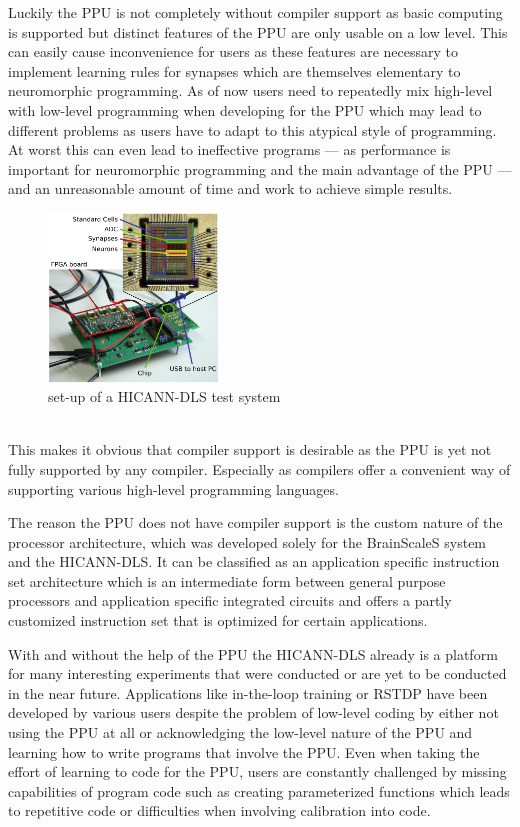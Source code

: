 Luckily the PPU is not completely without compiler support as basic computing is supported but distinct features of the PPU are only usable on a low level.
This can easily cause inconvenience for users as these features are necessary to implement learning rules for synapses which are themselves elementary to neuromorphic programming.
As of now users need to repeatedly mix high-level with low-level programming when developing for the PPU which may lead to different problems as users have to adapt to this atypical style of programming.
At worst this can even lead to ineffective programs --- as performance is important for neuromorphic programming and the main advantage of the PPU --- and an unreasonable amount of time and work to achieve simple results.
\\
\begin{figure}
    \centering
    \includegraphics[width=0.4\textwidth]{pictures/Fig1.png}
    \caption{\label{fig:dlsboard} set-up of a HICANN-DLS test system}
\end{figure}
\\
This makes it obvious that compiler support is desirable as the PPU is yet not fully supported by any compiler.
Especially as compilers offer a convenient way of supporting various high-level programming languages.

The reason the PPU does not have compiler support is the custom nature of the processor architecture, which was developed solely for the BrainScaleS system and the HICANN-DLS.
It can be classified as an application specific instruction set architecture which is an intermediate form between general purpose processors and application specific integrated circuits and offers a partly customized instruction set that is optimized for certain applications.

With and without the help of the PPU the HICANN-DLS already is a platform for many interesting experiments that were conducted or are yet to be conducted in the near future.
Applications like in-the-loop training or RSTDP have been developed by various users despite the problem of low-level coding by either not using the PPU at all or acknowledging the low-level nature of the PPU and learning how to write programs that involve the PPU.
Even when taking the effort of learning to code for the PPU, users are constantly challenged by missing capabilities of program code such as creating parameterized functions which leads to repetitive code or difficulties when involving calibration into code.

